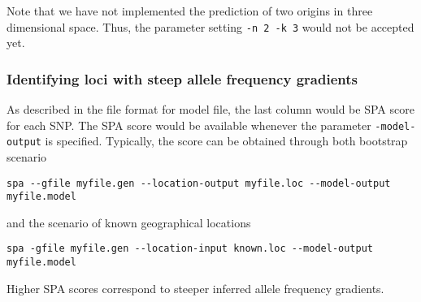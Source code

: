 \documentclass[12pt]{article}
\begin{document}
Note that we have not implemented the prediction of two origins in three dimensional space. Thus,
the parameter setting \verb+-n 2 -k 3+ would not be accepted yet.

\subsubsection*{Identifying loci with steep allele frequency gradients}

As described in the file format for model file, the last column would be SPA score for each SNP. 
The SPA score would be available whenever the parameter \verb+-model-output+ is specified. Typically,
the score can be obtained through both bootstrap scenario
\begin{verbatim}
spa --gfile myfile.gen --location-output myfile.loc --model-output myfile.model
\end{verbatim}
and the scenario of known geographical locations
\begin{verbatim}
spa -gfile myfile.gen --location-input known.loc --model-output myfile.model
\end{verbatim}
Higher SPA scores correspond to steeper inferred allele frequency gradients.
\end{document}

